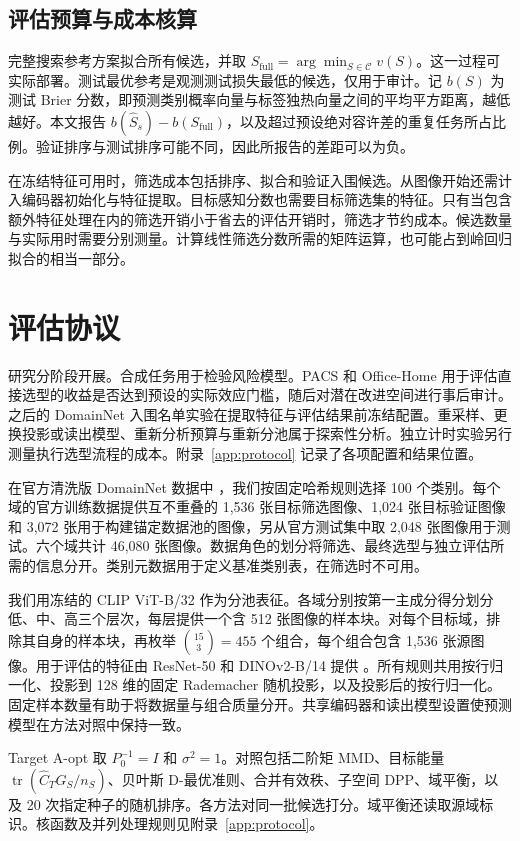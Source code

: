 \documentclass[UTF8,fontset=fandol,scheme=chinese,zihao=false,11pt,letterpaper]{ctexart}
\newcommand{\tr}{\operatorname{tr}}
\newcommand{\cC}{\mathcal{C}}
\begin{document}
\subsection{评估预算与成本核算}
完整搜索参考方案拟合所有候选，并取 $S_{\mathrm{full}}=\arg\min_{S\in\cC}v(S)$。这一过程可实际部署。测试最优参考是观测测试损失最低的候选，仅用于审计。记 $b(S)$ 为测试 Brier 分数，即预测类别概率向量与标签独热向量之间的平均平方距离，越低越好。本文报告 $b(\widehat S_s)-b(S_{\mathrm{full}})$，以及超过预设绝对容许差的重复任务所占比例。验证排序与测试排序可能不同，因此所报告的差距可以为负。

在冻结特征可用时，筛选成本包括排序、拟合和验证入围候选。从图像开始还需计入编码器初始化与特征提取。目标感知分数也需要目标筛选集的特征。只有当包含额外特征处理在内的筛选开销小于省去的评估开销时，筛选才节约成本。候选数量与实际用时需要分别测量。计算线性筛选分数所需的矩阵运算，也可能占到岭回归拟合的相当一部分。

\section{评估协议}
\label{sec:protocol}
研究分阶段开展。合成任务用于检验风险模型。PACS 和 Office-Home \citep{li2017,venkateswara2017} 用于评估直接选型的收益是否达到预设的实际效应门槛，随后对潜在改进空间进行事后审计。之后的 DomainNet 入围名单实验在提取特征与评估结果前冻结配置。重采样、更换投影或读出模型、重新分析预算与重新分池属于探索性分析。独立计时实验另行测量执行选型流程的成本。附录~\ref{app:protocol} 记录了各项配置和结果位置。

在官方清洗版 DomainNet 数据中 \citep{peng2019}，我们按固定哈希规则选择 100 个类别。每个域的官方训练数据提供互不重叠的 1,536 张目标筛选图像、1,024 张目标验证图像和 3,072 张用于构建锚定数据池的图像，另从官方测试集中取 2,048 张图像用于测试。六个域共计 46,080 张图像。数据角色的划分将筛选、最终选型与独立评估所需的信息分开。类别元数据用于定义基准类别表，在筛选时不可用。

我们用冻结的 CLIP ViT-B/32 \citep{radford2021} 作为分池表征。各域分别按第一主成分得分划分低、中、高三个层次，每层提供一个含 512 张图像的样本块。对每个目标域，排除其自身的样本块，再枚举 $\binom{15}{3}=455$ 个组合，每个组合包含 1,536 张源图像。用于评估的特征由 ResNet-50 和 DINOv2-B/14 提供 \citep{he2016,oquab2024}。所有规则共用按行归一化、投影到 128 维的固定 Rademacher 随机投影，以及投影后的按行归一化。固定样本数量有助于将数据量与组合质量分开。共享编码器和读出模型设置使预测模型在方法对照中保持一致。

Target A-opt 取 $P_0^{-1}=I$ 和 $\sigma^2=1$。对照包括二阶矩 MMD、目标能量 $\tr(\widehat C_TG_S/n_S)$、贝叶斯 D-最优准则、合并有效秩、子空间 DPP、域平衡，以及 20 次指定种子的随机排序。各方法对同一批候选打分。域平衡还读取源域标识。核函数及并列处理规则见附录~\ref{app:protocol}。
\end{document}
